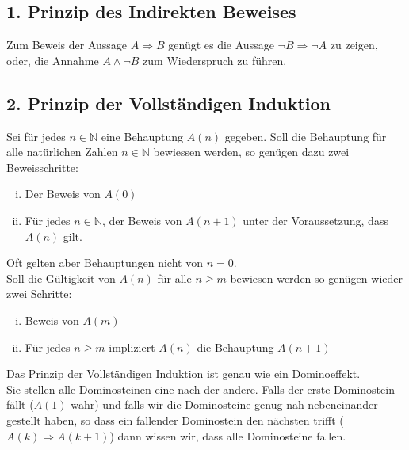  \subsection*{1. Prinzip des Indirekten Beweises}
Zum Beweis der Aussage $A\Rightarrow B$ genügt es die Aussage $\lnot B\Rightarrow\lnot A$ zu zeigen, oder, die Annahme $A\land\lnot B$ zum Wiederspruch zu führen.
\subsection*{2. Prinzip der Vollständigen Induktion}
Sei für jedes $n\in\mathbb{N}$ eine Behauptung $A(n)$ gegeben. Soll die Behauptung für alle natürlichen Zahlen $n\in\mathbb{N}$ bewiessen werden, so genügen dazu zwei Beweisschritte:
\begin{enumerate}[i)]
\item Der Beweis von $A(0)$
\item Für jedes $n\in\mathbb{N}$, der Beweis von $A(n+1)$ unter der Voraussetzung, dass $A(n)$ gilt. 
\end{enumerate}
Oft gelten aber Behauptungen nicht von $n=0$. \\
Soll die Gültigkeit von $A(n)$ für alle $n\geq m$ bewiesen werden so genügen wieder zwei Schritte:
\begin{enumerate}[i)]
	\item Beweis von $A(m)$
	\item Für jedes $n\geq m$ impliziert $A(n)$ die Behauptung $A(n+1)$
\end{enumerate}
Das Prinzip der Vollständigen Induktion ist genau wie ein Dominoeffekt.\\

Sie stellen alle Dominosteinen eine nach der andere. Falls der erste Dominostein fällt ($A(1)$ wahr) und falls wir die Dominosteine genug nah nebeneinander gestellt haben, so dass ein fallender Dominostein den nächsten trifft ($A(k)\Rightarrow A(k+1)$) dann wissen wir, dass alle Dominosteine fallen. 

